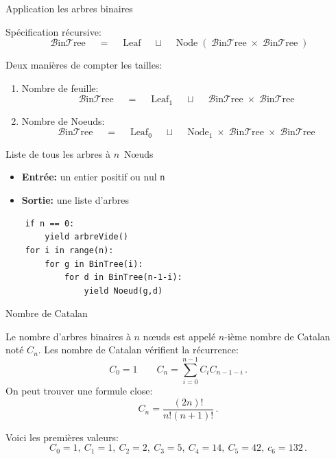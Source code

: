\documentclass{beamer}
\def\opstyle#1{\ensuremath{\operatorname{#1}}}
\begin{document}
\newcommand{\BinTree}{\opstyle{\mathcal{B}in\mathcal{T}ree}}
\newcommand{\Leaf}{\opstyle{Leaf}}
\newcommand{\Node}{\opstyle{Node}}

\begin{frame}{Application les arbres binaires}

  Spécification récursive:
  \[\BinTree\quad=\quad\Leaf\quad \sqcup\quad \Node(\BinTree\times\BinTree)\]
  \pause\bigskip

  Deux manières de compter les tailles:
  \begin{enumerate}
  \item Nombre de feuille:
  \[\BinTree\quad=\quad\Leaf_1\quad \sqcup\quad \BinTree\times\BinTree\]
  \item Nombre de Noeuds:
  \[\BinTree\quad=\quad\Leaf_0\quad \sqcup\quad \Node_1\times\BinTree\times\BinTree\]
  \end{enumerate}
\end{frame}

\begin{frame}[fragile]{Liste de tous les arbres à $n$~N\oe uds}
   \begin{ALGO}
    \begin{itemize}
    \item \textbf{Entrée:} un entier positif ou nul \texttt{n}
    \item \textbf{Sortie:} une liste d'arbres
    \end{itemize}
\begin{verbatim}
    if n == 0:
        yield arbreVide()
    for i in range(n):
        for g in BinTree(i):
            for d in BinTree(n-1-i):
                yield Noeud(g,d)
\end{verbatim}
  \end{ALGO}
\end{frame}

\begin{frame}{Nombre de Catalan}
  \begin{PROP}
    Le nombre d'arbres binaires à $n$ n\oe uds est appelé $n$-ième nombre de
    Catalan noté $C_n$. Les nombre de Catalan vérifient la récurrence:
    \begin{equation*}
      C_0=1\qquad C_n = \sum_{i=0}^{n-1} C_i C_{n-1-i}\,.
    \end{equation*}
    On peut trouver une formule close:
    \begin{equation*}
      C_n = \frac{(2n)!}{n!(n+1)!}\,.
    \end{equation*}
  \end{PROP}
  Voici les premières valeurs:
  \[C_0=1,\ C_1=1,\ C_2=2,\ C_3=5,\ C_4=14,\ C_5=42,\ c_6=132\,.\]
\end{frame}
\end{document}
